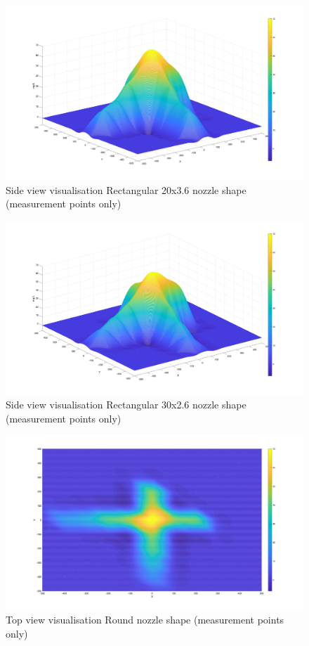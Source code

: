 \begin{figure}
    \centering
    \includegraphics[width=0.75\linewidth]{Images/Rec20_side_Mpoint.jpg}
    \caption{Side view visualisation Rectangular 20x3.6 nozzle shape (measurement points only)}
\end{figure}

\begin{figure}
    \centering
    \includegraphics[width=0.75\linewidth]{Images/Rec30_side_Mpoint.jpg}
    \caption{Side view visualisation Rectangular 30x2.6 nozzle shape (measurement points only)}
\end{figure}

\begin{figure}
    \centering
    \includegraphics[width=0.75\linewidth]{Images/Round_top_Mpoint.jpg}
    \caption{Top view visualisation Round nozzle shape (measurement points only)}
\end{figure}

